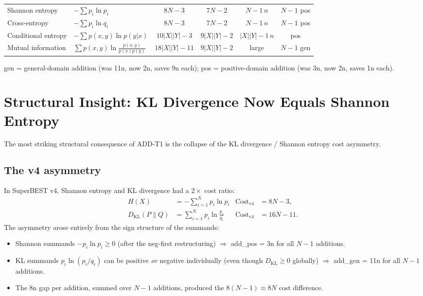 \documentclass[12pt,a4paper]{article}
\theoremstyle{definition}
\newcommand{\Cost}{\mathrm{Cost}}
\begin{document}
\begin{table}[h]
\begin{tabular}{@{}lp{3.2cm}cccc@{}}
\midrule
Shannon entropy   & $-\sum p_i \ln p_i$        & $8N{-}3$ & $7N{-}2$ & $N{-}1\,n$ & $N{-}1$ pos \\
Cross-entropy     & $-\sum p_i \ln q_i$        & $8N{-}3$ & $7N{-}2$ & $N{-}1\,n$ & $N{-}1$ pos \\
Conditional entropy & $-\sum p(x,y)\ln p(y|x)$& $10|X||Y|{-}3$ & $9|X||Y|{-}2$ & $|X||Y|{-}1\,n$ & pos \\
Mutual information& $\sum p(x,y)\ln\frac{p(x,y)}{p(x)p(y)}$
                                               & $18|X||Y|{-}11$ & $9|X||Y|{-}2$ & large & $N{-}1$ gen \\
\bottomrule
\end{tabular}

\smallskip
\noindent\small gen = general-domain addition (was 11n, now 2n, saves 9n each);
pos = positive-domain addition (was 3n, now 2n, saves 1n each).
\end{table}

\section{Structural Insight: KL Divergence Now Equals Shannon Entropy}
\label{sec:insight}

The most striking structural consequence of ADD-T1 is the collapse of the
KL divergence / Shannon entropy cost asymmetry.

\subsection*{The v4 asymmetry}

In SuperBEST v4, Shannon entropy and KL divergence had a $2\times$ cost ratio:
\begin{align*}
  H(X)         &= -\sum_{i=1}^N p_i \ln p_i  & \Cost_{\mathrm{v4}} &= 8N - 3, \\
  D_{\mathrm{KL}}(P \| Q) &= \sum_{i=1}^N p_i \ln \frac{p_i}{q_i}
                                              & \Cost_{\mathrm{v4}} &= 16N - 11.
\end{align*}
The asymmetry arose entirely from the sign structure of the summands:
\begin{itemize}
  \item Shannon summands $-p_i \ln p_i \geq 0$ (after the neg-first restructuring)
        $\Rightarrow$ add\_pos = 3n for all $N-1$ additions.
  \item KL summands $p_i \ln(p_i/q_i)$ can be positive \emph{or} negative
        individually (even though $D_{\mathrm{KL}} \geq 0$ globally)
        $\Rightarrow$ add\_gen = 11n for all $N-1$ additions.
  \item The 8n gap per addition, summed over $N-1$ additions, produced the
        $8(N-1) \approx 8N$ cost difference.
\end{itemize}
\end{document}
